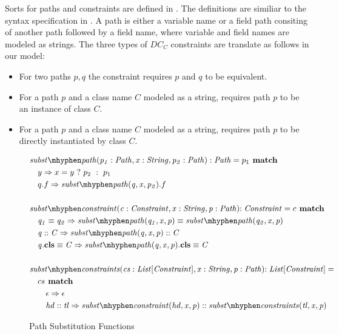 Sorts for paths and constraints are defined in .
The definitions are similiar to the syntax specification in .
A path is either a variable name or a field path consiting
of another path followed by a field name, where variable and field names
are modeled as strings.
The three types of $DC_C$ constraints are translate as follows in our model:
\begin{itemize}
  \item For two paths $p, q$ the constraint  requires $p$ and $q$
        to be equivalent.
  \item For a path $p$ and a class name $C$ modeled as a string,
         requires path $p$ to be an instance of class $C$.
  \item For a path $p$ and a class name $C$ modeled as a string,
         requires path $p$ to be directly instantiated by class $C$.
\end{itemize}\quad
\begin{figure}[t]
\centering
\begin{align*}
&\substpath{p_1: Path}{x: String}{p_2: Path}:\mIt{Path} = p_1 \match\\
&\quad y \Rightarrow \ite{x=y}{p_2}{p_1}\\
&\quad q.f \Rightarrow \substpath{q}{x}{p_2}.f\\
\\
&\substconstr{c: Constraint}{x: String}{p: Path}\mathit{: Constraint} = c \match \\
&\quad \case{\pathEq{q_1}{q_2}}
  {\pathEq
    {\substpath{q_1}{x}{p}}
    {\substpath{q_2}{x}{p}}}\\
&\quad \case{\instOf{q}{C}}
  {\instOf{\substpath{q}{x}{p}}{C}}\\
&\quad \case{\instBy{q}{C}}
  {\instBy{\substpath{q}{x}{p}}{C}}\\\\
&\substconstrs{cs: List[Constraint]}{x: String}{p: Path}\mathit{: List[Constraint]} =\\
&\quad cs \match\\
&\qquad \case{\epsilon}{\epsilon}\\
&\qquad \case{hd :: tl}
  {\substconstr{hd}{x}{p} ::
  \substconstrs{tl}{x}{p}}
\end{align*}
\caption{Path Substitution Functions}
\label{subfig:axioms-naive-general-funs}
\end{figure}\\
